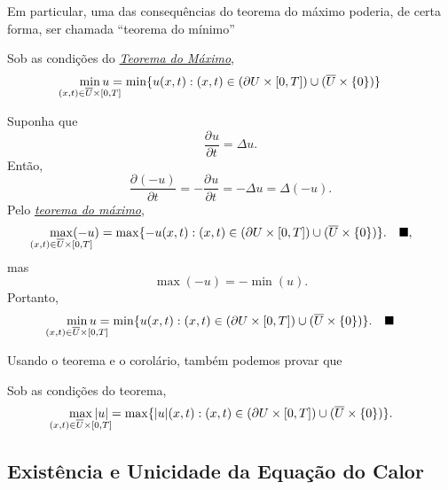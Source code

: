\documentclass[../pde_notes.tex]{subfiles}
\begin{document}
Em particular, uma das consequências do teorema do máximo poderia, de certa forma, ser chamada ``teorema do mínimo''
\begin{crl*}
	Sob as condições do \hyperlink{strong_maximum}{\textit{Teorema do Máximo}},
	\[
		\min_{\mathclap{(x, t)\in \overline{U}\times [0, T]}} u = \min_{}\{u(x, t):(x, t)\in(\partial U\times [0,T])\cup (\overline{U}\times \{0\})\}
	\]
\end{crl*}
\begin{proof*}
	Suponha que
	\[
		\frac{\partial^{}u}{\partial t^{}}=\Delta u.
	\]
	Então,
	\[
		\frac{\partial^{}(-u)}{\partial t^{}}=-\frac{\partial^{}u}{\partial t^{}}=-\Delta u=\Delta (-u).
	\]
	Pelo \hyperlink{strong_maximum}{\textit{teorema do máximo}},
	\[
		\max_{\mathclap{(x, t)\in \overline{U}\times [0,T]}}(-u) =\max_{}\{-u(x, t):(x, t)\in(\partial U\times [0,T])\cup (\overline{U}\times \{0\})\}.\quad \text{\qedsymbol},
	\]
	mas
	\[
		\max_{}(-u)=-\min_{}(u).
	\]
	Portanto,
	\[
		\min_{\mathclap{(x, t)\in \overline{U}\times [0, T]}} u = \min_{}\{u(x, t):(x, t)\in(\partial U\times [0,T])\cup (\overline{U}\times \{0\})\}.\quad \text{\qedsymbol}
	\]
\end{proof*}
Usando o teorema e o corolário, também podemos provar que
\begin{crl*}
	Sob as condições do teorema,
	\[
		\max_{\mathclap{(x, t)\in \overline{U}\times [0, T]}} |u| = \max_{}\{|u|(x, t):(x, t)\in(\partial U\times [0,T])\cup (\overline{U}\times \{0\})\}.
	\]
\end{crl*}

\subsection{Existência e Unicidade da Equação do Calor}
\end{document}
